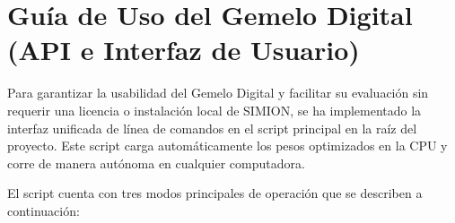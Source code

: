 \documentclass[12pt,letterpaper]{article}
\begin{document}
\begin{table}[H]
    \centering
    \caption{Comparación de voltajes físicos: Configuración Original vs. Estimación Inversa del Gemelo Digital (Trial 104).}
    \label{tab:voltage_comparison}
\end{table}

\section{Guía de Uso del Gemelo Digital (API e Interfaz de Usuario)}
Para garantizar la usabilidad del Gemelo Digital y facilitar su evaluación sin requerir una licencia o instalación local de SIMION, se ha implementado la interfaz unificada de línea de comandos en el script principal  en la raíz del proyecto. Este script carga automáticamente los pesos optimizados en la CPU y corre de manera autónoma en cualquier computadora.

El script cuenta con tres modos principales de operación que se describen a continuación:
\end{document}
